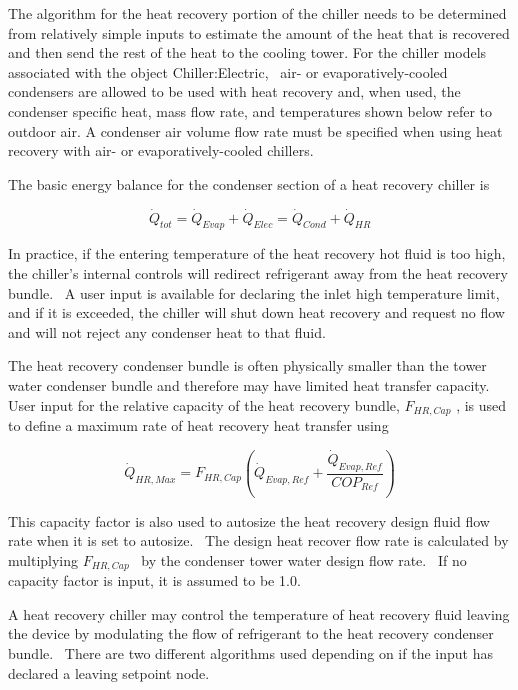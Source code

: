 The algorithm for the heat recovery portion of the chiller needs to be determined from relatively simple inputs to estimate the amount of the heat that is recovered and then send the rest of the heat to the cooling tower. For the chiller models associated with the object Chiller:Electric,~ air- or evaporatively-cooled condensers are allowed to be used with heat recovery and, when used, the condenser specific heat, mass flow rate, and temperatures shown below refer to outdoor air. A condenser air volume flow rate must be specified when using heat recovery with air- or evaporatively-cooled chillers.

The basic energy balance for the condenser section of a heat recovery chiller is

\begin{equation}
{\dot Q_{tot}} = {\dot Q_{Evap}} + {\dot Q_{Elec}} = {\dot Q_{Cond}} + {\dot Q_{HR}}
\end{equation}

In practice, if the entering temperature of the heat recovery hot fluid is too high, the chiller's internal controls will redirect refrigerant away from the heat recovery bundle.~ A user input is available for declaring the inlet high temperature limit, and if it is exceeded, the chiller will shut down heat recovery and request no flow and will not reject any condenser heat to that fluid.

The heat recovery condenser bundle is often physically smaller than the tower water condenser bundle and therefore may have limited heat transfer capacity.~ User input for the relative capacity of the heat recovery bundle, \({F_{HR,Cap}}\) , is used to define a maximum rate of heat recovery heat transfer using

\begin{equation}
{\dot Q_{HR,Max}} = {F_{HR,Cap}}\left( {{{\dot Q}_{Evap,Ref}} + \frac{{{{\dot Q}_{Evap,Ref}}}}{{CO{P_{Ref}}}}} \right)
\end{equation}

This capacity factor is also used to autosize the heat recovery design fluid flow rate when it is set to autosize.~ The design heat recover flow rate is calculated by multiplying \({F_{HR,Cap}}\) ~by the condenser tower water design flow rate.~ If no capacity factor is input, it is assumed to be 1.0.

A heat recovery chiller may control the temperature of heat recovery fluid leaving the device by modulating the flow of refrigerant to the heat recovery condenser bundle.~ There are two different algorithms used depending on if the input has declared a leaving setpoint node.

